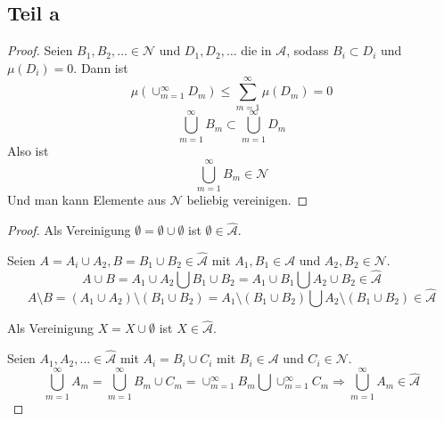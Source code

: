 \documentclass[10pt,a4paper]{article}
\begin{document}
\subsection{Teil a}
\begin{proof}
  Seien $B_{1}, B_{2}, \dots \in \mathscr{N}$ und $D_{1}, D_{2}, \dots$ die in $\mathscr{A}$, sodass $B_{i} \subset D_{i}$ und $\mu(D_{i}) = 0$.
  Dann ist
  \begin{equation}
    \mu(\cup_{m = 1}^{\infty} D_{m}) \le \sum_{m = 1}^{\infty} \mu(D_{m}) = 0
  \end{equation}
  \begin{equation}
    \bigcup_{m = 1}^{\infty} B_{m} \subset \bigcup_{m = 1}^{\infty} D_{m}
  \end{equation}
  Also ist
  \begin{equation}
    \bigcup_{m = 1}^{\infty} B_{m} \in \mathscr{N}
  \end{equation}
  Und man kann Elemente aus $\mathscr{N}$ beliebig vereinigen.
\end{proof}
\begin{proof}
  Als Vereinigung $\emptyset = \emptyset \cup \emptyset$ ist $\emptyset \in \widehat{\mathscr{A}}$.

  Seien $A = A_{i} \cup A_{2}, B = B_{1} \cup B_{2} \in \widehat{\mathscr{A}}$ mit $A_{1}, B_{1} \in \mathscr{A}$ und $A_{2}, B_{2} \in \mathscr{N}$.
  \begin{equation}
    A \cup B = A_{1} \cup A_{2} \bigcup B_{1} \cup B_{2} = A_{1} \cup B_{1} \bigcup A_{2} \cup B_{2} \in \widehat{\mathscr{A}}
  \end{equation}
  \begin{equation}
    A \setminus B = (A_{1} \cup A_{2}) \setminus (B_{1} \cup B_{2}) = A_{1} \setminus (B_{1} \cup B_{2}) \bigcup A_{2} \setminus (B_{1} \cup B_{2}) \in \widehat{\mathscr{A}}
  \end{equation}
  
  Als Vereinigung $X = X \cup \emptyset$ ist $X \in \widehat{\mathscr{A}}$.

  Seien $A_{1}, A_{2}, \dots \in \widehat{\mathscr{A}}$ mit $A_{i} = B_{i} \cup C_{i}$ mit $B_{i} \in \mathscr{A}$ und $C_{i} \in \mathscr{N}$.
  \begin{equation}
    \bigcup_{m = 1}^{\infty} A_{m} = \bigcup_{m = 1}^{\infty} B_{m} \cup C_{m} = \cup_{m = 1}^{\infty} B_{m} \bigcup \cup_{m = 1}^{\infty} C_{m} \Rightarrow \bigcup_{m = 1}^{\infty} A_{m} \in \widehat{\mathscr{A}}
  \end{equation}
\end{proof}
\end{document}
